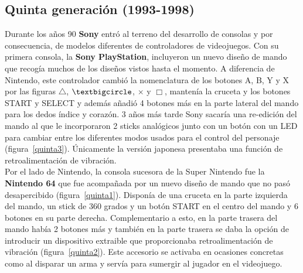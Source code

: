 \subsection{Quinta generaci\'on (1993-1998)}



Durante los a\~nos 90 \textbf{Sony} entr\'o al terreno del desarrollo de consolas y por consecuencia, de modelos diferentes de controladores de videojuegos. Con su primera consola, la \textbf{Sony PlayStation}, incluyeron un nuevo dise\~no de mando que recog\'ia muchos de los dise\~nos vistos hasta el momento. A diferencia de Nintendo, este controlador cambi\'o la nomenclatura de los botones A, B, Y y X por las figuras $\triangle$, $\textbigcircle$, $\times$ y $\Box$, manten\'ia la cruceta y los botones START y SELECT y adem\'as a\~nadi\'o 4 botones m\'as en la parte lateral del mando para los dedos \'indice y coraz\'on. 3 a\~nos m\'as tarde Sony sacar\'ia una re-edici\'on del mando al que le incorporaron 2 sticks anal\'ogicos junto con un bot\'on con un LED para cambiar entre los diferentes modos usados para el control del personaje (figura~\ref{quinta3}). \'Unicamente la versi\'on japonesa presentaba una funci\'on de retroalimentaci\'on de vibraci\'on. \\

Por el lado de Nintendo, la consola sucesora de la Super Nintendo fue la \textbf{Nintendo 64} que fue acompa\~nada por un nuevo dise\~no de mando que no pas\'o desapercibido (figura~\ref{quinta1}). Dispon\'ia de una cruceta en la parte izquierda del mando, un stick de 360 grados y un bot\'on START en el centro del mando y 6 botones en su parte derecha. Complementario a esto, en la parte trasera del mando hab\'ia 2 botones m\'as y tambi\'en en la parte trasera se daba la opci\'on de introducir un dispositivo extraible que proporcionaba retroalimentaci\'on de vibraci\'on (figura~\ref{quinta2}). Este accesorio se activaba en ocasiones concretas como al disparar un arma y serv\'ia para sumergir al jugador en el videojuego.\\

